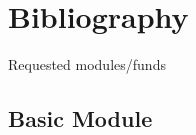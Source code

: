 \documentclass[10pt,fleqn,twoside]{article}
\begin{document}
\section{Bibliography}

\begingroup
\renewcommand{\section}[2]{}%
%


\endgroup



\section{Requested modules/funds}
\renewcommand{\leftmark}{\sc  Requested modules/funds}

\subsection{Basic Module}
\end{document}
